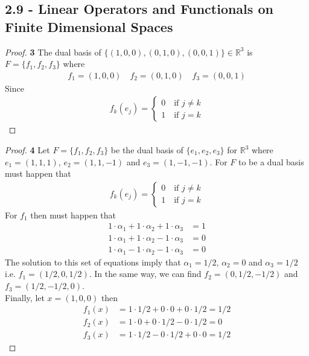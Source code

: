 \documentclass[11pt]{article}
\newcommand{\R}{\mathbb{R}}
\theoremstyle{definition}
\begin{document}
\subsection*{2.9 - Linear Operators and Functionals on Finite Dimensional Spaces}
\begin{proof}{\textbf{3}}
    The dual basis of $\{(1,0,0), (0,1,0), (0,0,1)\} \in \R^3$ is
    $F = \{f_1, f_2, f_3\}$ where
    \begin{align*}
        f_1 = (1, 0, 0) \quad f_2 = (0,1,0) \quad f_3 = (0,0,1)
    \end{align*}
    Since
    \begin{align*}
        f_k(e_j) = \begin{cases}
            0 \quad\mbox{if } j \neq k\\
            1 \quad\mbox{if } j = k
        \end{cases}
    \end{align*}
\end{proof}
\begin{proof}{\textbf{4}}
    Let $F = \{f_1, f_2, f_3\}$ be the dual basis of $\{e_1, e_2, e_3\}$ for
    $\R^3$ where $e_1 = (1,1,1)$, $e_2 = (1,1,-1)$ and $e_3 = (1,-1,-1)$.
    For $F$ to be a dual basis must happen that
    \begin{align*}
        f_k(e_j) = \begin{cases}
            0 \quad\mbox{if } j \neq k\\
            1 \quad\mbox{if } j = k
        \end{cases}
    \end{align*}
    For $f_1$ then must happen that
    \begin{align*}
        1\cdot \alpha_1 + 1 \cdot \alpha_2 + 1 \cdot \alpha_3 &= 1\\
        1\cdot \alpha_1 + 1 \cdot \alpha_2 - 1 \cdot \alpha_3 &= 0 \\
        1\cdot \alpha_1 - 1 \cdot \alpha_2 - 1 \cdot \alpha_3 &= 0 
    \end{align*}
    The solution to this set of equations imply that $\alpha_1 = 1/2$,
    $\alpha_2 = 0$ and $\alpha_3 = 1/2$ i.e. $f_1 = (1/2, 0, 1/2)$.
    In the same way, we can find $f_2 = (0, 1/2, -1/2)$ and
    $f_3 = (1/2, -1/2, 0)$.\\
    Finally, let $x = (1, 0, 0)$ then
    \begin{align*}
        f_1(x) &= 1 \cdot 1/2 + 0\cdot 0 + 0 \cdot 1/2 = 1/2\\
        f_2(x) &= 1 \cdot 0 + 0\cdot 1/2 - 0 \cdot 1/2 = 0\\
        f_3(x) &= 1 \cdot 1/2 - 0\cdot 1/2 + 0 \cdot 0 = 1/2
    \end{align*}
\end{proof}
\end{document}

